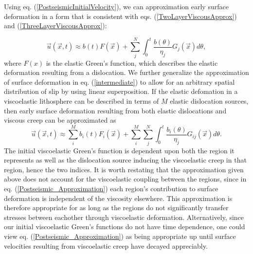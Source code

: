 \documentclass[extra,mreferee]{gji}
\begin{document}
Using eq. (\ref{PostseismicInitialVelocity}), we can approximation
early surface deformation in a form that is consistent with
eqs. (\ref{TwoLayerViscousApprox}) and
(\ref{ThreeLayerViscousApprox}):

\begin{equation}\label{intermediate}
\vec{u}(\vec{x},t) \approx b(t)F(\vec{x}) + \sum_j^N\int_0^t
\frac{b(\theta)}{\eta_j}G_j(\vec{x}) d\theta,
\end{equation}
where $F(x)$ is the elastic Green's function, which describes the
elastic deformation resulting from a dislocation.  We further
generalize the approximation of surface deformation in
eq. (\ref{intermediate}) to allow for an arbitrary spatial
distribution of slip by using linear superposition.  If the elastic
defomation in a viscoelastic lithosphere can be described in terms of
$M$ elastic dislocation sources, then early surface deformation
resulting from both elastic dislocations and viscous creep can be
approximated as 
\begin{equation}\label{Postseismic_Approximation}
\vec{u}(\vec{x},t) \approx \sum_i^Mb_i(t)F_i(\vec{x}) +
\sum_i^M\sum_j^N\int_0^t\frac{b_i(\theta)}{\eta_j}G_{ij}(\vec{x}) d\theta.
\end{equation}
The initial viscoelastic Green's function is dependent upon both the
region it represents as well as the dislocation source inducing the
viscoelastic creep in that region, hence the two indices.  It is worth
restating that the approximation given above does not account for the
viscoelastic coupling between the regions, since in
eq. (\ref{Postseismic_Approximation}) each region's contribution to
surface deformation is independent of the viscosity elsewhere.  This
approximation is therefore appropriate for as long as the regions do
not significantly transfer stresses between eachother through
viscoelastic deformation.  Alternatively, since our initial
viscoelastic Green's functions do not have time dependence, one could
view eq. (\ref{Postseismic_Approximation}) as being appropriate up
until surface velocities resulting from viscoelastic creep have
decayed appreciably.
\end{document}
